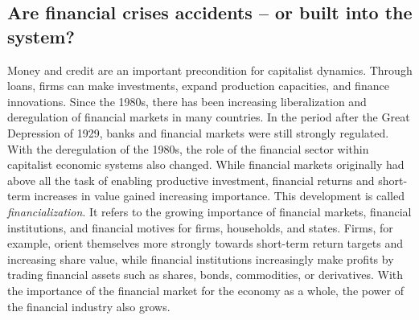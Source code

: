 \documentclass[
  british,
  a4paper,
  DIV=11,
  numbers=noendperiod,
  oneside,
  openany]{scrreprt}
\begin{document}
\subsection{Are financial crises accidents -- or built into the
system?}\label{are-financial-crises-accidents-or-built-into-the-system}

Money and credit are an important precondition for capitalist dynamics.
Through loans, firms can make investments, expand production capacities,
and finance innovations. Since the 1980s, there has been increasing
liberalization and deregulation of financial markets in many countries.
In the period after the Great Depression of 1929, banks and financial
markets were still strongly regulated. With the deregulation of the
1980s, the role of the financial sector within capitalist economic
systems also changed. While financial markets originally had above all
the task of enabling productive investment, financial returns and
short-term increases in value gained increasing importance. This
development is called \emph{financialization}. It refers to the growing
importance of financial markets, financial institutions, and financial
motives for firms, households, and states. Firms, for example, orient
themselves more strongly towards short-term return targets and
increasing share value, while financial institutions increasingly make
profits by trading financial assets such as shares, bonds, commodities,
or derivatives. With the importance of the financial market for the
economy as a whole, the power of the financial industry also grows.
\end{document}
